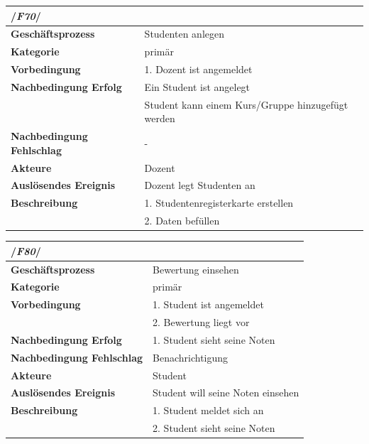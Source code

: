 		
			\begin{table}[H]
				\begin{tabular}{ll}
					\multicolumn{2}{l}{/\textbf{\textit{F70}}/}\\\hline
					 \textbf{Geschäftsprozess} & Studenten anlegen\\ 
					 \textbf{Kategorie} & primär \\ 
					 \textbf{Vorbedingung} & 1. Dozent ist angemeldet \phantom{aaaaaaaaaaaaaaaaaaaaaaaaaaaaaaa} \\
					 \textbf{Nachbedingung Erfolg} & Ein Student ist angelegt\\
					 & Student kann einem Kurs/Gruppe hinzugefügt werden\\
					 \textbf{Nachbedingung Fehlschlag} & -\\
					 \textbf{Akteure} & Dozent \\ 
					 \textbf{Auslösendes Ereignis} & Dozent legt Studenten an\\ 
					 \textbf{Beschreibung} &  1. Studentenregisterkarte erstellen\\
					 & 2. Daten befüllen\\
				 \end{tabular} 
				\label{tab:F70}
				\end{table}	
			
			\begin{table}[H]
				\begin{tabular}{ll}
					\multicolumn{2}{l}{/\textbf{\textit{F80}}/}\\\hline
					 \textbf{Geschäftsprozess} & Bewertung einsehen\\ 
					 \textbf{Kategorie} & primär \\ 
					 \textbf{Vorbedingung} & 1. Student ist angemeldet \phantom{aaaaaaaaaaaaaaaaaaaaaaaaaaaaaaa} \\
					 &2. Bewertung liegt vor\\
					 \textbf{Nachbedingung Erfolg} & 1. Student sieht seine Noten\\
					  \textbf{Nachbedingung Fehlschlag} & Benachrichtigung\\
					 \textbf{Akteure} & Student \\ 
					 \textbf{Auslösendes Ereignis} & Student will seine Noten einsehen\\ 
					 \textbf{Beschreibung} &  1. Student meldet sich an\\
					 & 2. Student sieht seine Noten\\
				 \end{tabular} 
				\label{tab:F80}
				\end{table}	



